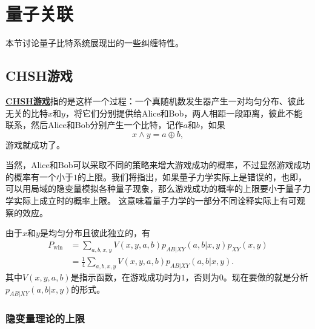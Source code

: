 \documentclass[hyperref, UTF8, a4paper]{ctexart}
\newcommand*{\concept}[1]{\underline{\textbf{#1}}}
\begin{document}
\section{量子关联}

本节讨论量子比特系统展现出的一些纠缠特性。%

\subsection{CHSH游戏}

\concept{CHSH游戏}指的是这样一个过程：一个真随机数发生器产生一对均匀分布、彼此无关的比特$x$和$y$，将它们分别提供给Alice和Bob，两人相距一段距离，彼此不能联系，然后Alice和Bob分别产生一个比特，记作$a$和$b$，如果
\begin{equation}
    x \land y = a \oplus b,
\end{equation}
游戏就成功了。

当然，Alice和Bob可以采取不同的策略来增大游戏成功的概率，不过显然游戏成功的概率有一个小于$1$的上限。我们将指出，如果量子力学实际上是错误的，也即，可以用局域的隐变量模拟各种量子现象，那么游戏成功的概率的上限要小于量子力学实际上成立时的概率上限。
这意味着量子力学的一部分不同诠释实际上有可观察的效应。

由于$x$和$y$是均匀分布且彼此独立的，有
\begin{equation}
    \begin{aligned}
        P_\text{win} &= \sum_{a, b, x, y} V(x, y, a, b) p_{AB|XY}(a, b | x, y) p_{XY}(x, y) \\
        &= \frac{1}{4} \sum_{a, b, x, y} V(x, y, a, b) p_{AB|XY}(a, b | x, y).
    \end{aligned}
\end{equation}
其中$V(x, y, a, b)$是指示函数，在游戏成功时为$1$，否则为$0$。现在要做的就是分析$p_{AB|XY}(a, b | x, y)$的形式。

\subsubsection{隐变量理论的上限}
\end{document}
